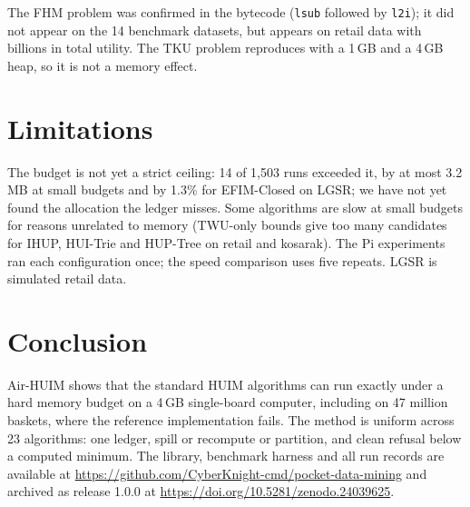 \documentclass[conference]{IEEEtran}
\begin{document}
The FHM problem was confirmed in the bytecode (\texttt{lsub} followed by \texttt{l2i}); it did not
appear on the 14 benchmark datasets, but appears on retail data with billions in total utility. The TKU problem reproduces with a 1\,GB and a 4\,GB heap, so it is
not a memory effect.

\section{Limitations}

The budget is not yet a strict ceiling: 14 of 1,503 runs exceeded it, by at most 3.2\,MB at small
budgets and by 1.3\% for EFIM-Closed on LGSR; we have not yet found the allocation the ledger
misses. Some algorithms are slow at small budgets for reasons unrelated to memory (TWU-only bounds
give too many candidates for IHUP, HUI-Trie and HUP-Tree on retail and kosarak). The Pi
experiments ran each configuration once; the speed comparison uses five repeats. LGSR is simulated
retail data.

\section{Conclusion}

Air-HUIM shows that the standard HUIM algorithms can run exactly under a hard memory budget on a
4\,GB single-board computer, including on 47 million baskets, where the reference implementation
fails. The method is uniform across 23 algorithms: one ledger, spill or recompute or partition, and
clean refusal below a computed minimum. The library, benchmark harness and all run records are
available at \url{https://github.com/CyberKnight-cmd/pocket-data-mining} and archived as release 1.0.0 at
\url{https://doi.org/10.5281/zenodo.24039625}.



\end{document}

